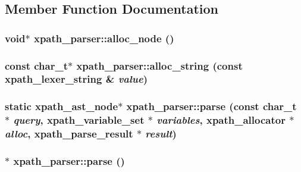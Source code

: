 \subsection{Member Function Documentation}
\hypertarget{structxpath__parser_ae33adcc8eb125124967d95297daff351}{
\subsubsection[{alloc\_\-node}]{\setlength{\rightskip}{0pt plus 5cm}void$\ast$ xpath\_\-parser::alloc\_\-node ()}}
\label{structxpath__parser_ae33adcc8eb125124967d95297daff351}
\hypertarget{structxpath__parser_a109e4c472bb76911a2b49ee741d400af}{
\subsubsection[{alloc\_\-string}]{\setlength{\rightskip}{0pt plus 5cm}const char\_\-t$\ast$ xpath\_\-parser::alloc\_\-string (const {\bf xpath\_\-lexer\_\-string} \& {\em value})}}
\label{structxpath__parser_a109e4c472bb76911a2b49ee741d400af}
\hypertarget{structxpath__parser_ab865a9a777b466365b3c4bd50290189d}{
\subsubsection[{parse}]{\setlength{\rightskip}{0pt plus 5cm}static {\bf xpath\_\-ast\_\-node}$\ast$ xpath\_\-parser::parse (const char\_\-t $\ast$ {\em query}, \/  xpath\_\-variable\_\-set $\ast$ {\em variables}, \/  {\bf xpath\_\-allocator} $\ast$ {\em alloc}, \/  xpath\_\-parse\_\-result $\ast$ {\em result})}}
\label{structxpath__parser_ab865a9a777b466365b3c4bd50290189d}
\hypertarget{structxpath__parser_a581e576958037e1ab682fb952b3ada38}{
\subsubsection[{parse}]{$\ast$ xpath\_\-parser::parse ()}}
